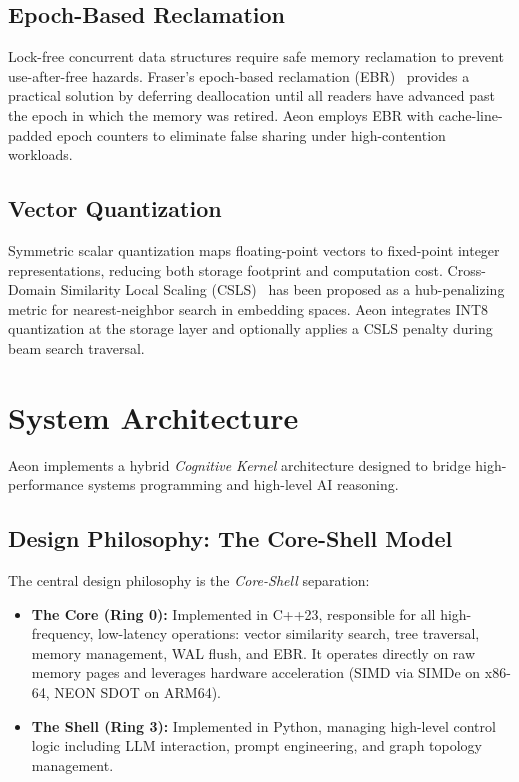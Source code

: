 \documentclass[10pt,twocolumn]{article}
\begin{document}
\subsection{Epoch-Based Reclamation}
Lock-free concurrent data structures require safe memory reclamation to prevent use-after-free hazards. Fraser's epoch-based reclamation (EBR)~\cite{fraser2004ebr} provides a practical solution by deferring deallocation until all readers have advanced past the epoch in which the memory was retired. Aeon employs EBR with cache-line-padded epoch counters to eliminate false sharing under high-contention workloads.

\subsection{Vector Quantization}
Symmetric scalar quantization maps floating-point vectors to fixed-point integer representations, reducing both storage footprint and computation cost. Cross-Domain Similarity Local Scaling (CSLS)~\cite{conneau2018csls} has been proposed as a hub-penalizing metric for nearest-neighbor search in embedding spaces. Aeon integrates INT8 quantization at the storage layer and optionally applies a CSLS penalty during beam search traversal.

\section{System Architecture}
\label{sec:architecture}
\label{sec:architecture}

Aeon implements a hybrid \textit{Cognitive Kernel} architecture designed to bridge high-performance systems programming and high-level AI reasoning.

\subsection{Design Philosophy: The Core-Shell Model}
The central design philosophy is the \textit{Core-Shell} separation:

\begin{itemize}
    \item \textbf{The Core (Ring 0):} Implemented in C++23, responsible for all high-frequency, low-latency operations: vector similarity search, tree traversal, memory management, WAL flush, and EBR. It operates directly on raw memory pages and leverages hardware acceleration (SIMD via SIMDe on x86-64, NEON SDOT on ARM64).
    \item \textbf{The Shell (Ring 3):} Implemented in Python, managing high-level control logic including LLM interaction, prompt engineering, and graph topology management.
\end{itemize}
\end{document}

